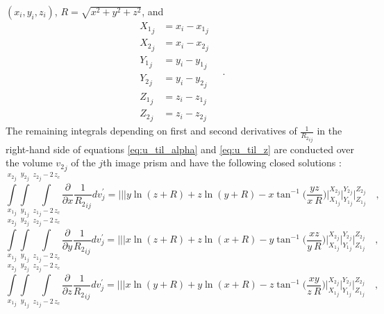 \documentclass[journal abbreviation, manuscript]{copernicus}
\begin{document}
$(x_i, y_i, z_i)$, $R = \sqrt{x^{2} + y^{2} + z^{2}}$, and
\begin{equation}
\begin{array}{ll}
{X_1}_{j} &= x_i - {x_1}_{j} \\
{X_2}_{j} &= x_i - {x_2}_{j} \\
{Y_1}_{j} &= y_i - {y_1}_{j} \\
{Y_2}_{j} &= y_i - {y_2}_{j} \\
{Z_1}_{j} &= z_i - {z_1}_{j} \\
{Z_2}_{j} &= z_i - {z_2}_{j}
\end{array} \quad .
\label{eq:Nagy_limits_1}
\end{equation}
The remaining integrals depending on first and second derivatives 
of ${\frac{1}{{R_2}_{ij}}}$ in the right-hand side of equations 
\ref{eq:u_til_alpha} and \ref{eq:u_til_z} are conducted over the volume 
${v_{2}}_{j}$ of the $j$th image prism and have the following closed solutions 
\citep{Nagyetal2000, Nagyetal2002}:
\begin{equation}
\int\limits_{{x_{1}}_{j}}^{{x_{2}}_{j}} \int\limits_{{y_{1}}_{j}}^{{y_{2}}_{j}} \int\limits_{{z_{1}}_{j} - 2 \, z_c}^{{z_{2}}_{j} - 2 \, z_c}
\frac{\partial }{\partial x} {\frac{1}{{R_2}_{ij}}} dv_{j}^{\prime} =
\Bigg|\Bigg|\Bigg| 
y \ln(z + R) + z \ln(y + R) -  x  \tan^{-1} \Bigg( \frac{yz}{x \: R} \Bigg) 
\Bigg|_{{X_1}_{j}}^{{X_2}_{j}} \Bigg|_{{Y_1}_{j}}^{{Y_2}_{j}} \Bigg|_{{Z_1}_{j}}^{{Z_2}_{j}} \quad ,
\label{dx2}
\end{equation}
\begin{equation}
\int\limits_{{x_{1}}_{j}}^{{x_{2}}_{j}} \int\limits_{{y_{1}}_{j}}^{{y_{2}}_{j}} \int\limits_{{z_{1}}_{j} - 2 \, z_c}^{{z_{2}}_{j} - 2 \, z_c}
\frac{\partial }{\partial y} {\frac{1}{{R_2}_{ij}}} dv_{j}^{\prime} =
\Bigg|\Bigg|\Bigg|
x \ln(z + R) + z \ln(x + R) -  y  \tan^{-1} \Bigg( \frac{xz}{y \: R} 
\Bigg)
\Bigg|_{{X_1}_{j}}^{{X_2}_{j}} \Bigg|_{{Y_1}_{j}}^{{Y_2}_{j}} \Bigg|_{{Z_1}_{j}}^{{Z_2}_{j}} \quad ,
\label{dy2}
\end{equation}
\begin{equation}
\int\limits_{{x_{1}}_{j}}^{{x_{2}}_{j}} \int\limits_{{y_{1}}_{j}}^{{y_{2}}_{j}} \int\limits_{{z_{1}}_{j} - 2 \, z_c}^{{z_{2}}_{j} - 2 \, z_c}
\frac{\partial }{\partial z} {\frac{1}{{R_2}_{ij}}} dv_{j}^{\prime} =
\Bigg|\Bigg|\Bigg|
x \ln(y + R) + y \ln(x + R) -  z  \tan^{-1} \Bigg( \frac{xy}{z \: R} \Bigg) 
\Bigg|_{{X_1}_{j}}^{{X_2}_{j}} \Bigg|_{{Y_1}_{j}}^{{Y_2}_{j}} \Bigg|_{{Z_1}_{j}}^{{Z_2}_{j}} \quad ,
\label{dz2}
\end{equation}
\end{document}

